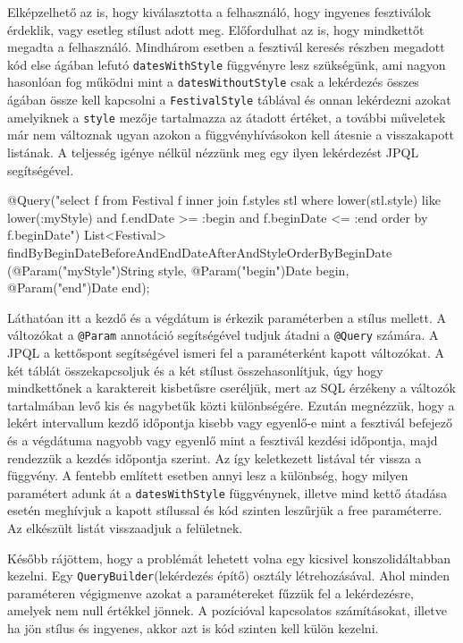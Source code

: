 Elképzelhető az is, hogy kiválasztotta a felhasználó, hogy ingyenes fesztiválok érdeklik, vagy esetleg stílust adott meg. Előfordulhat az is, hogy mindkettőt megadta a felhasználó. Mindhárom esetben a fesztivál keresés részben megadott kód else ágában lefutó \texttt{datesWithStyle} függvényre lesz szükségünk, ami nagyon hasonlóan fog működni mint a \texttt{datesWithoutStyle} csak a lekérdezés összes ágában össze kell kapcsolni a \texttt{FestivalStyle} táblával és onnan lekérdezni azokat amelyiknek a \texttt{style} mezője tartalmazza az átadott értéket, a további műveletek már nem változnak ugyan azokon a függvényhívásokon kell átesnie a visszakapott listának. A teljesség igénye nélkül nézzünk meg egy ilyen lekérdezést JPQL segítségével.

\begin{java}
@Query("select f from Festival f inner join f.styles stl where 
lower(stl.style) like lower(:myStyle) and f.endDate >= :begin
and f.beginDate <= :end order by f.beginDate")
List<Festival> 
findByBeginDateBeforeAndEndDateAfterAndStyleOrderByBeginDate
(@Param("myStyle")String style, @Param("begin")Date begin, 
@Param("end")Date end);
\end{java}

Láthatóan itt a kezdő és a végdátum is érkezik paraméterben a stílus mellett. A változókat a \texttt{@Param} annotáció segítségével tudjuk átadni a \texttt{@Query} számára. A JPQL a kettőspont segítségével ismeri fel a paraméterként kapott változókat. A két táblát összekapcsoljuk és a két stílust összehasonlítjuk, úgy hogy mindkettőnek a karaktereit kisbetűsre cseréljük, mert az SQL érzékeny a változók tartalmában levő kis és nagybetűk közti különbségére. Ezután megnézzük, hogy a lekért intervallum kezdő időpontja kisebb vagy egyenlő-e mint a fesztivál befejező és a végdátuma nagyobb vagy egyenlő mint a fesztivál kezdési időpontja, majd rendezzük a kezdés időpontja szerint. Az így keletkezett listával tér vissza a függvény. A fentebb említett esetben annyi lesz a különbség, hogy milyen paramétert adunk át a \texttt{datesWithStyle} függvénynek, illetve mind kettő átadása esetén meghívjuk a kapott stílussal és kód szinten leszűrjük a free paraméterre. Az elkészült listát visszaadjuk a felületnek.

Később rájöttem, hogy a problémát lehetett volna egy kicsivel konszolidáltabban kezelni. Egy \texttt{QueryBuilder}(lekérdezés építő) osztály létrehozásával. Ahol minden paraméteren végigmenve azokat a paramétereket fűzzük fel a lekérdezésre, amelyek nem null értékkel jönnek. A pozícióval kapcsolatos számításokat, illetve ha jön stílus és ingyenes, akkor azt is kód szinten kell külön kezelni. 

